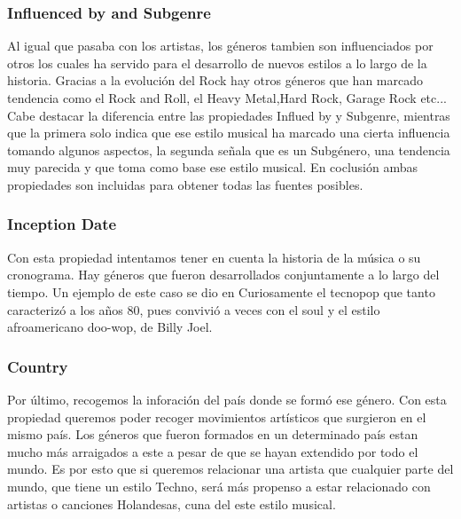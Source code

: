 \subsubsection*{Influenced by and Subgenre}
Al igual que pasaba con los artistas, los géneros tambien son influenciados por otros los cuales ha servido para el desarrollo de nuevos estilos a lo largo de la historia. Gracias a la evolución del Rock hay otros géneros que han marcado tendencia como 
el Rock and Roll, el Heavy Metal,Hard Rock, Garage Rock etc...
Cabe destacar la diferencia entre las propiedades Influed by y Subgenre, mientras que la primera solo indica que ese estilo musical ha marcado una cierta influencia tomando algunos aspectos, la segunda señala que es un Subgénero, una tendencia muy parecida y que toma como base ese estilo musical. En coclusión ambas propiedades son incluidas para obtener todas las fuentes posibles.

\subsubsection*{Inception Date}

Con esta propiedad intentamos tener en cuenta la historia de la música o su cronograma. Hay géneros que fueron desarrollados conjuntamente a lo largo del tiempo. Un ejemplo de este caso se dio en Curiosamente el tecnopop que tanto caracterizó a los años 80, pues convivió a veces con el soul y el estilo afroamericano doo-wop, de Billy Joel.


\subsubsection*{Country}

Por último, recogemos la inforación del país donde se formó ese género. Con esta propiedad queremos poder recoger movimientos artísticos que surgieron en el mismo país. Los géneros que fueron formados en un determinado país estan mucho más arraigados a este a pesar de que se hayan extendido por todo el mundo. Es por esto que si queremos relacionar una artista que cualquier parte del mundo, que tiene un estilo Techno, será más propenso a estar relacionado con artistas o canciones Holandesas, cuna del este estilo musical. 



